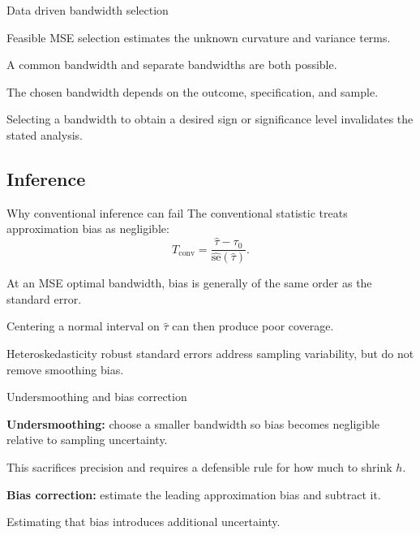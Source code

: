 \begin{frame}{Data driven bandwidth selection}
\begin{items}
\item Feasible MSE selection estimates the unknown curvature and variance terms.
\item A common bandwidth and separate bandwidths are both possible.
\item The chosen bandwidth depends on the outcome, specification, and sample.
\item Selecting a bandwidth to obtain a desired sign or significance level invalidates the stated analysis.
\end{items}
\end{frame}

\subsection{Inference}
\begin{frame}{Why conventional inference can fail}
The conventional statistic treats approximation bias as negligible:
\[
T_{\mathrm{conv}}=\frac{\widehat\tau-\tau_0}{\widehat{\mathrm{se}}(\widehat\tau)}.
\]
\begin{items}
\item At an MSE optimal bandwidth, bias is generally of the same order as the standard error.
\item Centering a normal interval on $\widehat\tau$ can then produce poor coverage.
\item Heteroskedasticity robust standard errors address sampling variability, but do not remove smoothing bias.
\end{items}
\end{frame}

\begin{frame}{Undersmoothing and bias correction}
\begin{items}
\item \textbf{Undersmoothing:} choose a smaller bandwidth so bias becomes negligible relative to sampling uncertainty.
\item This sacrifices precision and requires a defensible rule for how much to shrink $h$.
\item \textbf{Bias correction:} estimate the leading approximation bias and subtract it.
\item Estimating that bias introduces additional uncertainty.
\end{items}
\end{frame}

